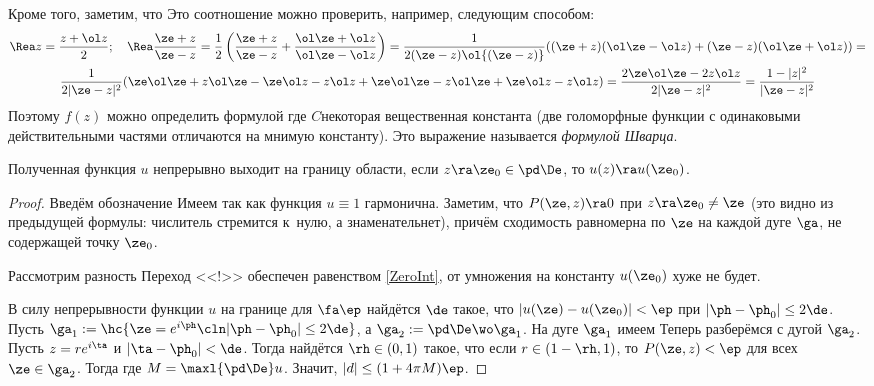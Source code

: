 \documentclass[a4paper]{article}
\begin{document}
Кроме того, заметим, что
Это соотношение можно проверить, например, следующим способом:
\begin{multline*}
  \Rea z = \frac{z + \ol z}{2};\quad
  \Rea \frac{\ze + z}{\ze - z} =
  \frac12 \left(\frac{\ze + z}{\ze - z} + \frac{\ol \ze + \ol z}{\ol \ze - \ol z}\right) =
  \frac{1}{2(\ze - z) \ol{(\ze - z)}}((\ze + z)(\ol \ze - \ol z) + (\ze - z)(\ol \ze + \ol z)) = \\
  \frac{1}{2|\ze - z|^2}(\ze \ol \ze + z \ol \ze - \ze \ol z - z \ol z + \ze \ol \ze - z \ol \ze + \ze \ol z - z \ol z) =
  \frac{2 \ze \ol \ze - 2 z \ol z}{2|\ze - z|^2} = \frac{1 - |z|^2}{|\ze - z|^2}
\end{multline*}
Поэтому $f(z)$ можно определить формулой
где $C$\ч некоторая вещественная константа (две голоморфные функции с одинаковыми действительными
частями отличаются на мнимую константу). Это выражение называется \emph{формулой Шварца}.

\begin{theorem}
Полученная функция $u$ непрерывно выходит на границу области,  если $z\ra \ze_0 \in \pd \De$, то
$u(z)\ra u(\ze_0)$.
\end{theorem}
\begin{proof}
Введём обозначение
Имеем
так как функция $u\equiv 1$ гармонична. Заметим, что
$P(\ze, z) \ra 0$ при $z\ra \ze_0 \neq \ze$ (это видно из предыдущей формулы: числитель стремится
к~нулю, а знаменатель\т нет), причём сходимость равномерна по $\ze$ на каждой дуге $\ga$, не
содержащей точку $\ze_0$.

Рассмотрим разность
Переход <<!>> обеспечен равенством \eqref{ZeroInt}, от умножения на константу $u(\ze_0)$ хуже не будет.

В силу непрерывности функции $u$ на границе для $\fa \ep$ найдётся $\de$ такое,
что $|u(\ze)-u(\ze_0)|<\ep$ при $|\ph-\ph_0|\le 2\de$. Пусть
$\ga_1 := \hc{\ze = e^{i\ph}\cln |\ph-\ph_0|\le 2\de}$, а $\ga_2 := \pd \De \wo \ga_1$.
На дуге $\ga_{1}$ имеем
Теперь разберёмся с дугой $\ga_2$. Пусть $z=re^{i\ta}$ и $|\ta-\ph_0|<\de$. Тогда
найдётся $\rh \in(0,1)$ такое, что если $r \in (1-\rh, 1)$, то $P(\ze,z)<\ep$ для
всех $\ze\in\ga_2$. Тогда
где $M = \maxl{\pd \De}u$. Значит, $|d| \le (1+4\pi M)\ep$.
\end{proof}
\end{document}
